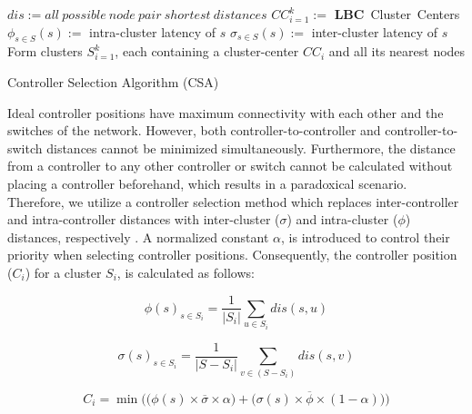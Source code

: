\documentclass[preprint,12pt]{elsarticle}
\begin{document}
	
	\begin{algorithm}
		\SetAlgoLined
		$dis := all~possible~node~pair~shortest~distances$\;
		$CC_{i=1}^k :=$ \textbf{LBC}~Cluster~Centers\;
		$\phi_{s\in S}(s) :=$ intra-cluster latency of $s$\;
		$\sigma_{s\in S}(s) :=$ inter-cluster latency of $s$\;
		Form clusters $S_{i=1}^k$, each containing a cluster-center $CC_i$ and all its nearest nodes\;
		\caption{Controller Selection Algorithm (CSA)} \label{algo:csa}
	\end{algorithm}
	
	Ideal controller positions have maximum connectivity with each other and the switches of the network. However, both controller-to-controller and controller-to-switch distances cannot be minimized simultaneously. Furthermore, the distance from a controller to any other controller or switch cannot be calculated without placing a controller beforehand, which results in a paradoxical scenario. Therefore, we utilize a controller selection method which replaces inter-controller and intra-controller distances with inter-cluster ($\sigma$) and intra-cluster ($\phi$) distances, respectively \cite{aziz2019degree}. A normalized constant $\alpha$, is introduced to control their priority when selecting controller positions. Consequently, the controller position ($C_i$) for a cluster $S_i$, is calculated as follows:
	
	\begin{equation} \label{eqn:intra}
	\phi(s)_{s\in S_i} = \frac{1}{|S_i|}\sum_{u\in S_i} dis(s,u)
	\end{equation}
	
	\begin{equation} \label{eqn:inter}
	\sigma(s)_{s\in S_i} = \frac{1}{|S-S_i|}\sum_{v\in (S-S_i)} dis(s,v)
	\end{equation}
	
	\begin{equation} \label{eqn:totlat}
	C_i = \min\bigg(\big( \phi(s)\times \overline{\sigma} \times \alpha \big) + \big( \sigma(s) \times \overline{\phi} \times (1-\alpha) \big) \bigg)
	\end{equation}
	
\end{document}
